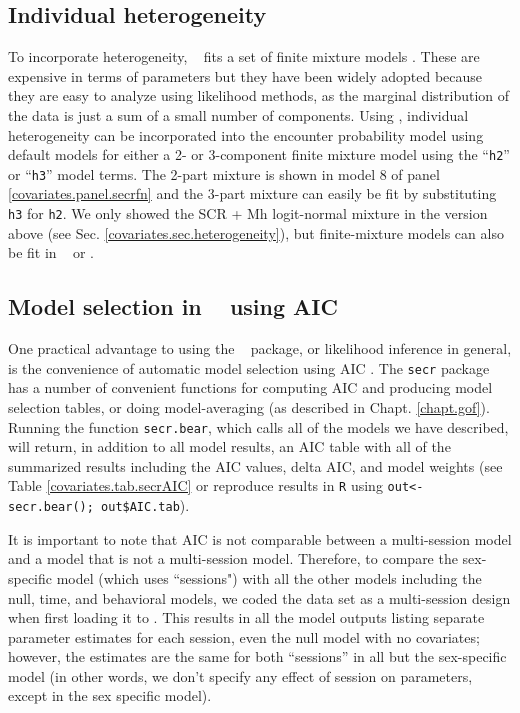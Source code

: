 \subsection{Individual heterogeneity}
\label{covariates.sec.secrH2}

To incorporate heterogeneity, \secr~ fits a set of finite mixture
models \citep{norris_pollock:1996, pledger:2000}. These are expensive
in terms of parameters but they have been widely adopted because they
are easy to analyze using likelihood methods, as the marginal
distribution of the data is just a sum of a small number of
components.  Using \secr, individual heterogeneity can be incorporated
into the encounter probability model using default models for either a
2- or 3-component finite mixture model using the ``\mbox{\tt h2}'' or
``\mbox{\tt h3}'' model terms.  The 2-part mixture is shown in model 8
of panel \ref{covariates.panel.secrfn} and the 3-part mixture can
easily be fit by substituting \mbox{\tt h3} for \mbox{\tt h2}.  We
only showed the SCR + Mh logit-normal mixture in the version above
(see Sec. \ref{covariates.sec.heterogeneity}), but finite-mixture
models can also be fit in \jags~ or \bugs.



\subsection{Model selection in \secr~ using AIC}

One practical advantage to using the \secr~ package, or likelihood
inference in general, is the convenience of automatic model selection
using AIC \citep{burnham_anderson:2002}. The \mbox{\tt secr} package
has a number of convenient functions for computing AIC and producing
model selection tables, or doing model-averaging (as described in
Chapt. \ref{chapt.gof}).  Running the function {\tt secr.bear}, which
calls all of the models we have described, will return, in addition to
all model results, an AIC table with all of the summarized results
including the AIC values, delta AIC, and model weights (see Table
\ref{covariates.tab.secrAIC} or reproduce results in {\tt R} using
{\tt out<- secr.bear(); out\$AIC.tab}).


It is important to note that AIC is not comparable between a
multi-session model and a model that is not a multi-session model.
Therefore, to compare the sex-specific model (which uses ``sessions")
with all the other models including the null, time, and behavioral
models, we coded the data set as a multi-session design when first
loading it to \secr.  This results in all the model outputs listing
separate parameter estimates for each session, even the null model
with no covariates; however, the estimates are the same for both
``sessions'' in all but the sex-specific model (in other words, we
don't specify any effect of session on parameters, except in the sex
specific model).


